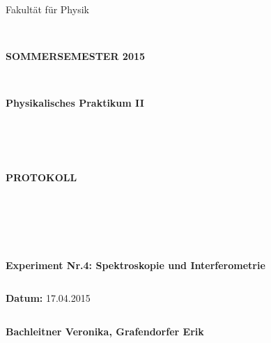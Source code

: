 \documentclass{article}
\begin{document}
\thispagestyle{empty}
			\begin{center}
			\Large{Fakultät für Physik}\\
			\end{center}
\begin{verbatim}


\end{verbatim}
			\begin{center}
			\textbf{\LARGE SOMMERSEMESTER 2015}
			\end{center}
\begin{verbatim}


\end{verbatim}
			\begin{center}
			\textbf{\LARGE{Physikalisches Praktikum II}}
			\end{center}
\begin{verbatim}




\end{verbatim}

			\begin{center}
			\textbf{\LARGE{PROTOKOLL}}
			\end{center}
			
\begin{verbatim}





\end{verbatim}

			\begin{flushleft}
			\textbf{\Large{Experiment Nr.4: Spektroskopie und Interferometrie}}\\
			\LARGE{}	
			\end{flushleft}

\begin{verbatim}

\end{verbatim}	
			\begin{flushleft}
			\textbf{\Large{Datum:}} \Large{17.04.2015}
			\end{flushleft}
			
\begin{verbatim}
\end{verbatim}
		\begin{flushleft}
			\textbf{\Large{Bachleitner Veronika, Grafendorfer Erik}} 
			\end{flushleft}
\end{document}
